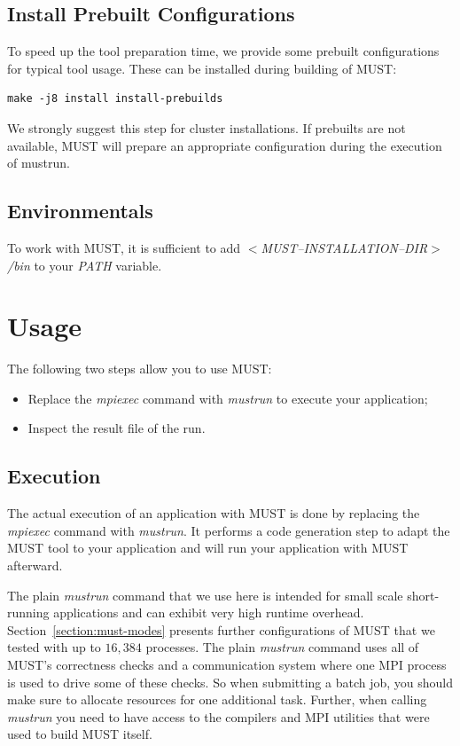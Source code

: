 \documentclass[english]{scrartcl}
\begin{document}
\subsection{Install Prebuilt Configurations}
To speed up the tool preparation time, we provide some prebuilt
configurations for typical tool usage. These can be installed during
building of MUST:
\begin{verbatim}
make -j8 install install-prebuilds
\end{verbatim}
We strongly suggest this step for cluster installations.
If prebuilts are not available, MUST will prepare an appropriate
configuration during the execution of mustrun.

\subsection{Environmentals}
\label{section:environmentals}
To work with MUST, it is sufficient to add \emph{$<$MUST\mbox{--}INSTALLATION\mbox{--}DIR$>$/bin} 
to your \emph{PATH} variable. 

\section{Usage}

The following two steps allow you to use MUST:
\begin{itemize}
\item Replace the \emph{mpiexec} command with
\emph{mustrun} to execute your application;
\item Inspect the result file of the run.
\end{itemize}

\subsection{Execution}

The actual execution of an application with MUST is done by replacing the
\emph{mpiexec} command with \emph{mustrun}. It performs a code generation step
to adapt the MUST tool to your application and will run your application with MUST afterward. 

The plain \emph{mustrun} command that we use here is intended for small scale
short-running applications and can exhibit very high runtime overhead.
Section~\ref{section:must-modes} presents further configurations of MUST that
we tested with up to $16,384$ processes.  The plain \emph{mustrun} command uses
all of MUST's correctness checks and a communication system where one MPI 
process is used to drive some of these
checks. So when submitting a batch job,
you should make sure to allocate resources for one additional task. Further,
when calling \emph{mustrun} you need to have access to the compilers and MPI
utilities that were used to build MUST itself.
\end{document}

